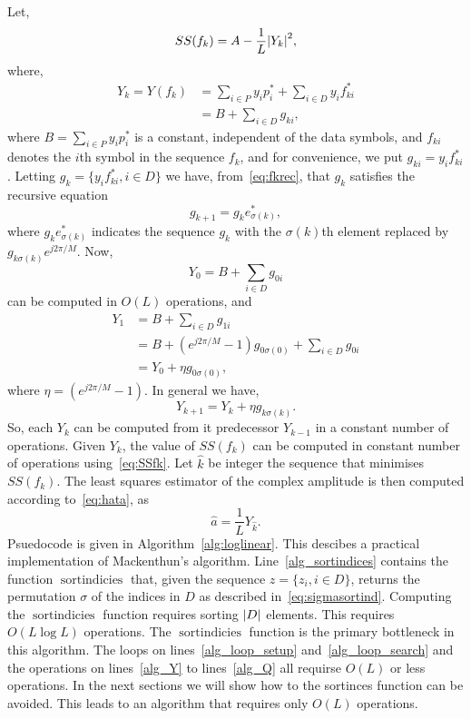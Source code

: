 \documentclass[a4paper,10pt]{article}
\begin{document}
Let,
\begin{equation}\label{eq:SSfk}
SS(f_k) = A - \frac{1}{L}{\left| Y_k \right|}^2,
\end{equation}
where, 
\begin{align*}
Y_k = Y( f_k ) &= \sum_{i \in P} y_i p_i^*  + \sum_{i \in D} y_i f_{ki}^* \\
&= B + \sum_{i \in D}g_{ki},
\end{align*}
where $B = \sum_{i \in P} y_i p_i^*$ is a constant, independent of the data symbols, and $f_{ki}$ denotes the $i$th symbol in the sequence $f_k$, and for convenience, we put $g_{ki}  = y_i f_{ki}^*$.  Letting $g_{k} =\{ y_i f_{ki}^*, i \in D\}$ we have, from~\eqref{eq:fkrec}, that $g_k$ satisfies the recursive equation
\[
g_{k+1} = g_{k} e_{\sigma(k)}^*,
\]
where $g_{k} e_{\sigma(k)}^*$ indicates the sequence $g_k$ with the $\sigma(k)$th element replaced by $g_{k \sigma(k)}e^{j2\pi/M}$.  Now,
\[
Y_0 = B + \sum_{i \in D} g_{0i}
\] 
can be computed in $O(L)$ operations, and
\begin{align*}
Y_1 &= B + \sum_{i \in D} g_{1i} \\
&= B +  (e^{j2\pi/M} - 1)g_{0\sigma(0)} + \sum_{i \in D} g_{0i} \\
&= Y_0 + \eta g_{0\sigma(0)},
\end{align*}
where $\eta = (e^{j2\pi/M} - 1)$.  In general we have,
\[
Y_{k+1} = Y_k + \eta g_{k\sigma(k)}.
\]
So, each $Y_k$ can be computed from it predecessor $Y_{k-1}$ in a constant number of operations.  Given $Y_k$, the value of $SS(f_k)$ can be computed in constant number of operations using~\eqref{eq:SSfk}.  Let $\hat{k}$ be integer the sequence that minimises $SS(f_k)$.  The least squares estimator of the complex amplitude is then computed according to~\eqref{eq:hata}, as 
\[
\hat{a} = \frac{1}{L} Y_{\hat{k}}.
\]
Psuedocode is given in Algorithm~\ref{alg:loglinear}.  This descibes a practical implementation of Mackenthun's algorithm.  Line~\ref{alg_sortindices} contains the function $\operatorname{sortindicies}$ that, given the sequence $z = \{z_i, i \in D\}$, returns the permutation $\sigma$ of the indices in $D$ as described in~\eqref{eq:sigmasortind}.  Computing the $\operatorname{sortindicies}$ function requires sorting ${\left| D \right|}$ elements.  This requires $O(L \log L)$ operations.  The $\operatorname{sortindicies}$ function is the primary bottleneck in this algorithm.  The loops on lines~\ref{alg_loop_setup} and~\ref{alg_loop_search} and the operations on lines~\ref{alg_Y} to lines~\ref{alg_Q} all requirse $O(L)$ or less operations.  In the next sections we will show how to the sortinces function can be avoided.  This leads to an algorithm that requires only $O(L)$ operations.
\end{document}
